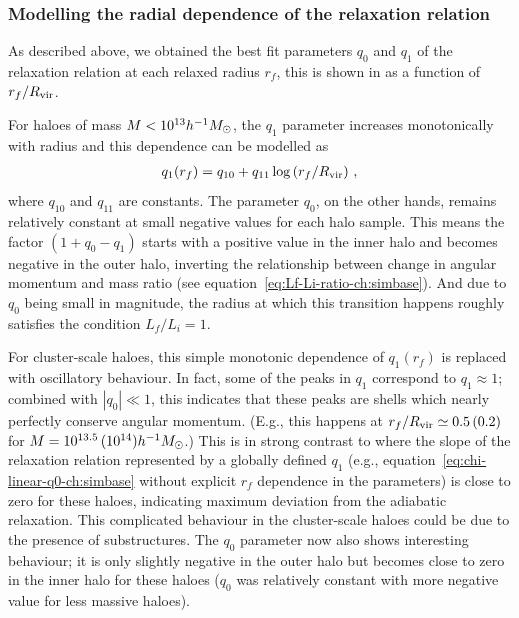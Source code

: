 \subsubsection{Modelling the radial dependence of the relaxation relation}
As described above, we obtained the best fit parameters $q_0$ and $q_1$ of the relaxation relation at each relaxed radius $r_f$, this is shown in  as a function of $r_f/R_{\rm vir}$. 

For haloes of mass $M<10^{13}h^{-1}M_{\odot}$, the $q_1$ parameter increases monotonically with radius and this dependence can be modelled as 
\begin{align}
q_1 (r_f) = q_{10} + q_{11} \log \left( r_f/R_{\rm vir} \right) \,,
\label{eq:q1(r_f)-ch:simbase}
\end{align}
where $q_{10}$ and $q_{11}$ are constants.
The parameter $q_0$, on the other hands, remains relatively constant at small negative values for each halo sample.
This means the factor $(1 + q_0 - q_1)$ starts with a positive value in the inner halo and becomes negative in the outer halo, inverting the relationship between change in angular momentum and mass ratio (see equation~\ref{eq:Lf-Li-ratio-ch:simbase}). And due to $q_0$ being small in magnitude, the radius at which this transition happens roughly satisfies the condition $L_f/L_i=1$. 

For cluster-scale haloes, this simple monotonic dependence of $q_1(r_f)$ is replaced with oscillatory behaviour. In fact, some of the peaks in $q_1$ correspond to $q_1\approx1$; combined with $|q_0|\ll1$, this indicates that these peaks are shells which nearly perfectly conserve angular momentum. (E.g., this happens at $r_f/R_{\rm vir}\simeq0.5\,(0.2)$ for $M=10^{13.5}\,(10^{14})h^{-1}M_{\odot}$.)
This is in strong contrast to  where the slope of the relaxation relation represented by a globally defined $q_1$ (e.g., equation~\ref{eq:chi-linear-q0-ch:simbase} without explicit $r_f$ dependence in the parameters) is close to zero for these haloes, indicating maximum deviation from the adiabatic relaxation. This complicated behaviour in the cluster-scale haloes could be due to the presence of substructures. The $q_0$ parameter now also shows interesting behaviour; it is only slightly negative in the outer halo but becomes close to zero in the inner halo for these haloes ($q_0$ was relatively constant with more negative value for less massive haloes).
 

